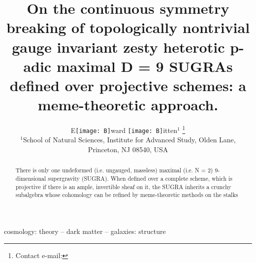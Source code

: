 \documentclass[usenatbib]{mnras}
\begin{document}
\title[Substructure Dynamics]{On the continuous symmetry breaking of topologically nontrivial gauge invariant zesty heterotic p-adic maximal D = 9 SUGRAs defined over projective schemes: a meme-theoretic approach.}
\author[EDD]{
E\texttt{[image: B]}ward \texttt{[image: B]}itten$^{1}$ \thanks{Contact e-mail:}
\\
$^{1}$School of Natural Sciences, Institute for Advanced Study, Olden Lane, Princeton,
NJ 08540, USA}
\maketitle
\begin{abstract}
There is only one undeformed (i.e. ungauged, massless) maximal (i.e. N = 2) 9-dimensional supergravity (SUGRA). When defined over a complete scheme, which is projective if there is an ample, invertible sheaf on it, the SUGRA inherits a crunchy subalgebra whose cohomology can be refined by meme-theoretic methods on the stalks 
\end{abstract}

\begin{keywords}
cosmology: theory -- dark matter -- galaxies: structure
\end{keywords}
\end{document}
